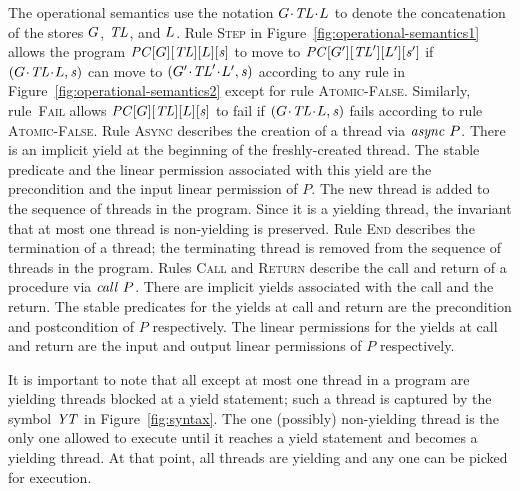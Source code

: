 The operational semantics use the notation ${G}\!\cdot\!{\mathit{TL}}\!\cdot\!{L}$ to denote the concatenation of the 
stores $G$, $\mathit{TL}$, and $L$.
Rule \textsc{Step} in Figure~\ref{fig:operational-semantics1} allows the program $\mathit{PC}[G][\mathit{TL}][L][\mathit{s}]$ to move 
to $\mathit{PC}[G'][\mathit{TL}'][L'][\mathit{s}']$
if $({G}\!\cdot\!{\mathit{TL}}\!\cdot\!{L}, \mathit{s})$ can move to $({G'}\!\cdot\!{\mathit{TL}'}\!\cdot\!{L'}, \mathit{s})$ 
according to any rule in Figure~\ref{fig:operational-semantics2} except for rule \textsc{Atomic-False}.
Similarly, rule~\textsc{Fail} allows $\mathit{PC}[G][\mathit{TL}][L][\mathit{s}]$ to fail if $({G}\!\cdot\!{\mathit{TL}}\!\cdot\!{L}, \mathit{s})$
fails according to rule \textsc{Atomic-False}. 
Rule \textsc{Async} describes the creation of a thread via $\mathit{async}\ P$.  
There is an implicit yield at the beginning of the freshly-created thread.
The stable predicate and the linear permission associated with this yield are 
the precondition and the input linear permission of $P$.
The new thread is added to the sequence of threads in the program.
Since it is a yielding thread, the invariant that at most one thread is non-yielding is preserved.
Rule \textsc{End} describes the termination of a thread; the terminating thread is removed
from the sequence of threads in the program.
Rules \textsc{Call} and \textsc{Return} describe the call and return of a procedure via $\mathit{call}\ P$.
There are implicit yields associated with the call and the return.
The stable predicates for the yields at call and return are the precondition and postcondition of $P$ respectively.
The linear permissions for the yields at call and return are the input and output linear permissions of $P$ respectively.

It is important to note that all except at most one thread in a program are yielding threads blocked at a yield statement;
such a thread is captured by the symbol $\mathit{YT}$ in Figure~\ref{fig:syntax}.
The one (possibly) non-yielding thread is the only one allowed to execute until it reaches a yield statement and becomes a yielding thread.
At that point, all threads are yielding and any one can be picked for execution.

